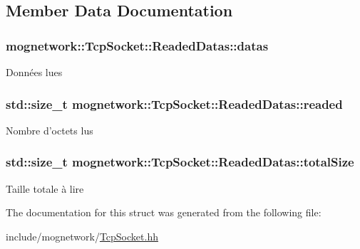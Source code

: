 \subsection{Member Data Documentation}
\hypertarget{structmognetwork_1_1_tcp_socket_1_1_readed_datas_abfdc3750f4970fde4212d7a0e934daa9}{
\subsubsection[{datas}]{ mognetwork\-::\-Tcp\-Socket\-::\-Readed\-Datas\-::datas}}\label{structmognetwork_1_1_tcp_socket_1_1_readed_datas_abfdc3750f4970fde4212d7a0e934daa9}
Données lues \hypertarget{structmognetwork_1_1_tcp_socket_1_1_readed_datas_a2c633a79efa956f1f59d9429e8584cc0}{
\subsubsection[{readed}]{\setlength{\rightskip}{0pt plus 5cm}std\-::size\-\_\-t mognetwork\-::\-Tcp\-Socket\-::\-Readed\-Datas\-::readed}}\label{structmognetwork_1_1_tcp_socket_1_1_readed_datas_a2c633a79efa956f1f59d9429e8584cc0}
Nombre d'octets lus \hypertarget{structmognetwork_1_1_tcp_socket_1_1_readed_datas_aac0aa498d4b98296434cf05785068dcc}{
\subsubsection[{total\-Size}]{\setlength{\rightskip}{0pt plus 5cm}std\-::size\-\_\-t mognetwork\-::\-Tcp\-Socket\-::\-Readed\-Datas\-::total\-Size}}\label{structmognetwork_1_1_tcp_socket_1_1_readed_datas_aac0aa498d4b98296434cf05785068dcc}
Taille totale à lire 

The documentation for this struct was generated from the following file\-:\begin{DoxyCompactItemize}
\item 
include/mognetwork/\hyperlink{_tcp_socket_8hh}{Tcp\-Socket.\-hh}\end{DoxyCompactItemize}
